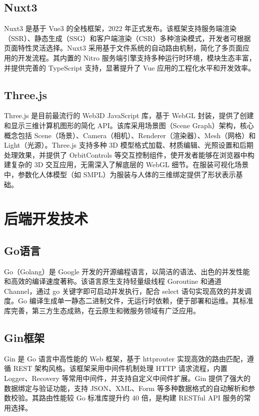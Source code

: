 \documentclass[twoside]{thesis-cls-Miya} %
\begin{document}
\subsection{Nuxt3}
Nuxt3 是基于 Vue3 的全栈框架，2022 年正式发布。该框架支持服务端渲染（SSR）、静态生成（SSG）和客户端渲染（CSR）多种渲染模式，开发者可根据页面特性灵活选择。Nuxt3 采用基于文件系统的自动路由机制，简化了多页面应用的开发流程。其内置的 Nitro 服务端引擎支持多种运行时环境，模块生态丰富，并提供完善的 TypeScript 支持，显著提升了 Vue 应用的工程化水平和开发效率。

\subsection{Three.js}
Three.js 是目前最流行的 Web3D JavaScript 库，基于 WebGL 封装，提供了创建和显示三维计算机图形的简化 API\cite{threejs}。该库采用场景图（Scene Graph）架构，核心概念包括 Scene（场景）、Camera（相机）、Renderer（渲染器）、Mesh（网格）和 Light（光源）。Three.js 支持多种 3D 模型格式加载、材质编辑、光照设置和后期处理效果，并提供了 OrbitControls 等交互控制组件，使开发者能够在浏览器中构建复杂的 3D 交互应用\cite{liu2022web3d}，无需深入了解底层的 WebGL 细节。在服装可视化场景中，参数化人体模型（如 SMPL\cite{loper2015smpl}）为服装与人体的三维绑定提供了形状表示基础。

\section{后端开发技术}

\subsection{Go语言}
Go（Golang）是 Google 开发的开源编程语言，以简洁的语法、出色的并发性能和高效的编译速度著称。该语言原生支持轻量级线程 Goroutine 和通道 Channel，通过 go 关键字即可启动并发执行，配合 select 语句实现高效的并发调度。Go 编译生成单一静态二进制文件，无运行时依赖，便于部署和运维。其标准库完善，第三方生态成熟，在云原生和微服务领域有广泛应用。

\subsection{Gin框架}
Gin 是 Go 语言中高性能的 Web 框架，基于 httprouter 实现高效的路由匹配\cite{gin_web_framework}，遵循 REST 架构风格\cite{fielding2000rest}。该框架采用中间件机制处理 HTTP 请求流程，内置 Logger、Recovery 等常用中间件，并支持自定义中间件扩展。Gin 提供了强大的数据绑定与验证功能，支持 JSON、XML、Form 等多种数据格式的自动解析和参数校验。其路由性能较 Go 标准库提升约 40 倍，是构建 RESTful API 服务的常用选择。
\end{document}
